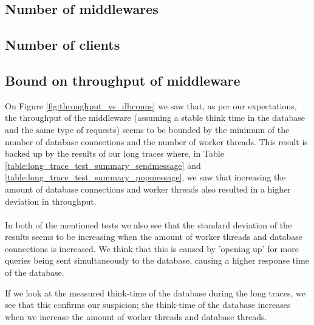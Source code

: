 \documentclass{article}
\begin{document}
        \subsection{Number of middlewares}

        \subsection{Number of clients}

        \subsection{Bound on throughput of middleware}
            On Figure \ref{fig:throughput_vs_dbconns} we saw that, as per our expectations, the throughput of the middleware (assuming a stable think time in the database and the same type of requests) seems to be bounded by the minimum of the number of database connections and the number of worker threads.
            This result is backed up by the results of our long traces where, in Table \ref{table:long_trace_test_summary_sendmessage} and \ref{table:long_trace_test_summary_popmessage}, we saw that increasing the amount of database connections and worker threads also resulted in a higher deviation in throughput.\\
            \\
            In both of the mentioned tests we also see that the standard deviation of the results seems to be increasing when the amount of worker threads and database connections is increased. We think that this is caused by 'opening up' for more queries being sent simultaneously to the database, causing a higher response time of the database. 

            If we look at the measured think-time of the database during the long traces, we see that this confirms our suspicion; the think-time of the database increases when we increase the amount of worker threads and database threads.
\end{document}

